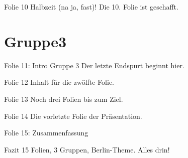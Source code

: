 \documentclass{beamer}
\begin{document}
\begin{frame}{Folie 10}
    Halbzeit (na ja, fast)! Die 10. Folie ist geschafft.
\end{frame}


\section{Gruppe3}

\begin{frame}{Folie 11: Intro Gruppe 3}
    Der letzte Endspurt beginnt hier.
\end{frame}

\begin{frame}{Folie 12}
    Inhalt für die zwölfte Folie.
\end{frame}

\begin{frame}{Folie 13}
    Noch drei Folien bis zum Ziel.
\end{frame}

\begin{frame}{Folie 14}
    Die vorletzte Folie der Präsentation.
\end{frame}

\begin{frame}{Folie 15: Zusammenfassung}
    \begin{block}{Fazit}
        15 Folien, 3 Gruppen, Berlin-Theme. Alles drin!
    \end{block}
\end{frame}
\end{document}
